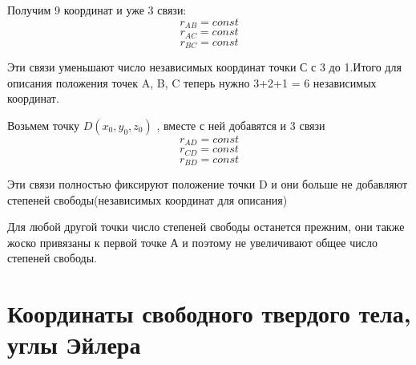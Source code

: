 \documentclass[../main.tex]{subfiles}
\begin{document}
Получим 9 координат и уже 3 связи:
\[r_{AB} = const\]
\[r_{AC} = const\]
\[r_{BC} = const\]

Эти связи уменьшают число независимых координат точки С с 3 до 1.Итого для описания положения точек A, B, C теперь нужно 3+2+1 = 6 независимых координат.

Возьмем точку $D(x_0,y_0,z_0)$ , вместе с ней добавятся и 3 связи
\[ r_{AD} = const\]
\[ r_{CD} = const\]
\[ r_{BD} = const\]

Эти связи полностью фиксируют положение точки D и они больше не добавляют степеней свободы(независимых координат для описания)

Для любой другой точки число степеней свободы останется прежним, они также жоско привязаны к первой точке А и поэтому не увеличивают общее число степеней свободы.

\section{Координаты свободного твердого тела, углы Эйлера}
\end{document}
